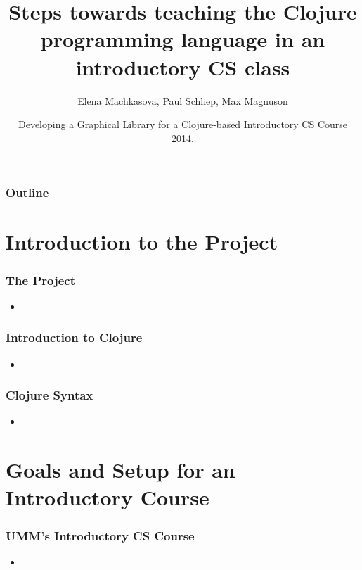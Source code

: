 \documentclass{beamer}
\begin{document}
\title{Steps towards teaching the Clojure programming language in an introductory CS  class}
\author{Elena Machkasova, Paul Schliep, Max Magnuson}
\date[April 25, 2014]  
{Developing a Graphical Library for a Clojure-based Introductory CS Course 2014.}

\begin{frame}
  \titlepage
\end{frame}

\begin{frame}

  \frametitle{Outline}
\tableofcontents

\end{frame}

\section{Introduction to the Project}

\begin{frame}
\frametitle{The Project}
\begin{itemize}
\item
\end{itemize}
\end{frame}

\begin{frame}
\frametitle{Introduction to Clojure}
\begin{itemize}
\item
\end{itemize}
\end{frame}

\begin{frame}
\frametitle{Clojure Syntax}
\begin{itemize}
\item
\end{itemize}
\end{frame}

\section{Goals and Setup for an Introductory Course}

\begin{frame}
\frametitle{UMM's Introductory CS Course}
\begin{itemize}
\item
\end{itemize}
\end{frame}
\end{document}
